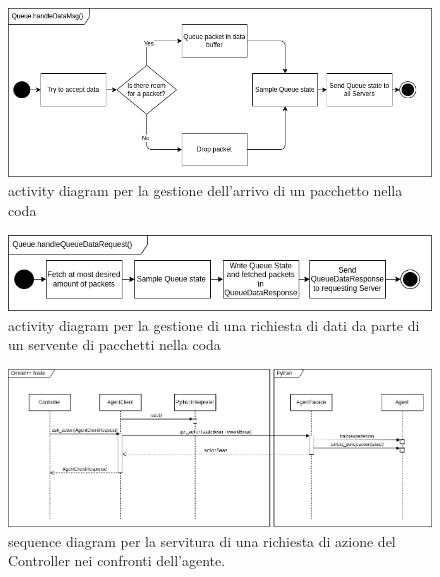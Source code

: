 \documentclass[conference]{IEEEtran}
\begin{document}
\begin{figure}
    \centering
    \includegraphics[width=\textwidth]{figs/queue_handleDataMsg_activity_diagram.drawio.png}
    \caption{activity diagram per la gestione dell'arrivo di un pacchetto nella coda}
    \label{fig:queue_handleDataMsg_activity_diagram}
\end{figure}
\begin{figure}
    \centering
    \includegraphics[width=\textwidth]{figs/queue_handleQueueDataRequest_activity_diagram.drawio.png}
    \caption{activity diagram per la gestione di una richiesta di dati da parte di un servente di pacchetti nella coda}
    \label{fig:queue_handleQueueDataRequest_activity_diagram}
\end{figure}
\begin{figure}
    \centering
    \includegraphics[width=\textwidth]{figs/agentc_sequence_diagram.drawio.png}
    \caption{sequence diagram per la servitura di una richiesta di azione del Controller nei confronti dell'agente.}
    \label{fig:agentc_sequence_diagram}
\end{figure}
\end{document}

